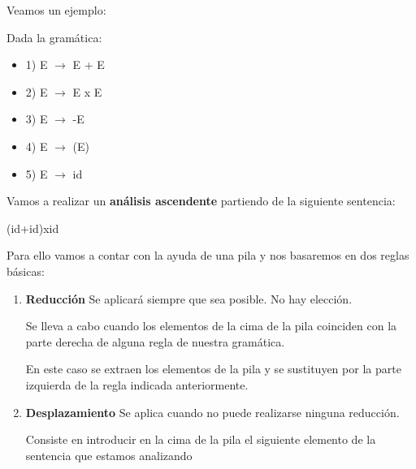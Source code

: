 \documentclass{apuntes}
\begin{document}
Veamos un ejemplo:
\begin{example}
Dada la gramática:
\begin{itemize}
\item 1) E $\rightarrow$ E + E
\item 2) E $\rightarrow$ E x E
\item 3) E $\rightarrow$ -E
\item 4) E $\rightarrow$ (E)
\item 5) E $\rightarrow$ id
\end{itemize}

Vamos a realizar un \textbf{análisis ascendente} partiendo de la siguiente sentencia:
\begin{center}
(id+id)xid
\end{center}

Para ello vamos a contar con la ayuda de una pila y nos basaremos en dos reglas básicas:
\begin{enumerate}
\item \textbf{Reducción}
Se aplicará siempre que sea posible. No hay elección.

Se lleva a cabo cuando los elementos de la cima de la pila coinciden con la parte derecha de alguna regla de nuestra gramática.

En este caso se extraen los elementos de la pila y se sustituyen por la parte izquierda de la regla indicada anteriormente.

\item \textbf{Desplazamiento}
Se aplica cuando no puede realizarse ninguna reducción.

Consiste en introducir en la cima de la pila el siguiente elemento de la sentencia que estamos analizando
\end{enumerate}


\end{example}
\end{document}
